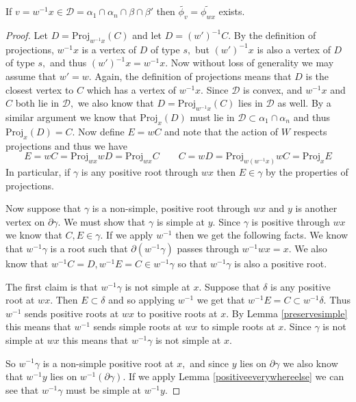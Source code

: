 \documentclass[class=book, crop=false,12 pt]{standalone}
\begin{document}
\begin{lemma}
	If $v=w^{-1}x\in \mathcal{D}=\alpha_1\cap \alpha_n\cap \beta \cap \beta'$ then $\tilde{\phi_v}=\tilde{\phi_{wx}}$ exists.
	\label{Dexists}
\end{lemma}
\begin{proof}
	Let $D=\mathrm{Proj}_{w^{-1}x}(C)$ and let $D=(w')^{-1}C.$ By the definition of projections, $w^{-1}x$ is a vertex of $D$ of type $s,$ but $(w')^{-1}x$ is also a vertex of $D$ of type $s,$ and thus $(w')^{-1}x=w^{-1}x.$ Now without loss of generality we may assume that $w'=w.$ Again, the definition of projections means that $D$ is the closest vertex to $C$ which has a vertex of $w^{-1}x.$ Since $\mathcal{D}$ is convex, and $w^{-1}x$ and $C$ both lie in $\mathcal{D},$ we also know that $D=\mathrm{Proj}_{w^{-1}x}(C)$ lies in $\mathcal{D}$ as well. By a similar argument we know that $\mathrm{Proj}_{x}(D)$ must lie in $\mathcal{D}\subset \alpha_1\cap \alpha_n$ and thus $\mathrm{Proj}_{x}(D)=C.$ Now define $E=wC$ and note that the action of $W$ respects projections and thus we have
	\[
		E=wC=\mathrm{Proj}_{wx}{wD}=\mathrm{Proj}_{wx}{C} \qquad C=wD=\mathrm{Proj}_{w(w^{-1}x)}{wC}=\mathrm{Proj}_{x}{E}
	\]
In particular, if $\gamma$ is any positive root through $wx$ then $E\in \gamma$ by the properties of projections.



Now suppose that $\gamma$ is a non-simple, positive root through $wx$ and $y$ is another vertex on $\partial \gamma.$ We must show that $\gamma$ is simple at $y.$ Since $\gamma$ is positive through $wx$ we know that $C,E\in \gamma.$ If we apply $w^{-1}$ then we get the following facts. We know that $w^{-1}\gamma$ is a root such that $\partial (w^{-1}\gamma)$ passes through $w^{-1}wx=x.$ We also know that $w^{-1}C=D,w^{-1}E=C\in w^{-1}\gamma$ so that $w^{-1}\gamma$ is also a positive root.

The first claim is that $w^{-1}\gamma$ is not simple at $x.$ Suppose that $\delta$ is any positive root at $wx.$ Then $E\subset \delta$ and so applying $w^{-1}$ we get that $w^{-1}E=C\subset w^{-1}\delta.$ Thus $w^{-1}$ sends positive roots at $wx$ to positive roots at $x.$ By Lemma \ref{preservesimple} this means that $w^{-1}$ sends simple roots at $wx$ to simple roots at $x.$ Since $\gamma$ is not simple at $wx$ this means that $w^{-1}\gamma$ is not simple at $x.$

So $w^{-1}\gamma$ is a non-simple positive root at $x,$ and since $y$ lies on $\partial \gamma$ we also know that $w^{-1}y$ lies on $w^{-1}(\partial \gamma).$ If we apply Lemma \ref{positiveeverywhereelse} we can see that $w^{-1}\gamma$ must be simple at $w^{-1}y.$ 


\end{proof}
\end{document}
